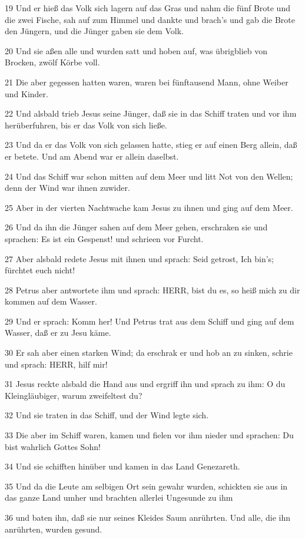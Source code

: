 \par 19 Und er hieß das Volk sich lagern auf das Gras und nahm die fünf Brote und die zwei Fische, sah auf zum Himmel und dankte und brach's und gab die Brote den Jüngern, und die Jünger gaben sie dem Volk.
\par 20 Und sie aßen alle und wurden satt und hoben auf, was übrigblieb von Brocken, zwölf Körbe voll.
\par 21 Die aber gegessen hatten waren, waren bei fünftausend Mann, ohne Weiber und Kinder.
\par 22 Und alsbald trieb Jesus seine Jünger, daß sie in das Schiff traten und vor ihm herüberfuhren, bis er das Volk von sich ließe.
\par 23 Und da er das Volk von sich gelassen hatte, stieg er auf einen Berg allein, daß er betete. Und am Abend war er allein daselbst.
\par 24 Und das Schiff war schon mitten auf dem Meer und litt Not von den Wellen; denn der Wind war ihnen zuwider.
\par 25 Aber in der vierten Nachtwache kam Jesus zu ihnen und ging auf dem Meer.
\par 26 Und da ihn die Jünger sahen auf dem Meer gehen, erschraken sie und sprachen: Es ist ein Gespenst! und schrieen vor Furcht.
\par 27 Aber alsbald redete Jesus mit ihnen und sprach: Seid getrost, Ich bin's; fürchtet euch nicht!
\par 28 Petrus aber antwortete ihm und sprach: HERR, bist du es, so heiß mich zu dir kommen auf dem Wasser.
\par 29 Und er sprach: Komm her! Und Petrus trat aus dem Schiff und ging auf dem Wasser, daß er zu Jesu käme.
\par 30 Er sah aber einen starken Wind; da erschrak er und hob an zu sinken, schrie und sprach: HERR, hilf mir!
\par 31 Jesus reckte alsbald die Hand aus und ergriff ihn und sprach zu ihm: O du Kleingläubiger, warum zweifeltest du?
\par 32 Und sie traten in das Schiff, und der Wind legte sich.
\par 33 Die aber im Schiff waren, kamen und fielen vor ihm nieder und sprachen: Du bist wahrlich Gottes Sohn!
\par 34 Und sie schifften hinüber und kamen in das Land Genezareth.
\par 35 Und da die Leute am selbigen Ort sein gewahr wurden, schickten sie aus in das ganze Land umher und brachten allerlei Ungesunde zu ihm
\par 36 und baten ihn, daß sie nur seines Kleides Saum anrührten. Und alle, die ihn anrührten, wurden gesund.

